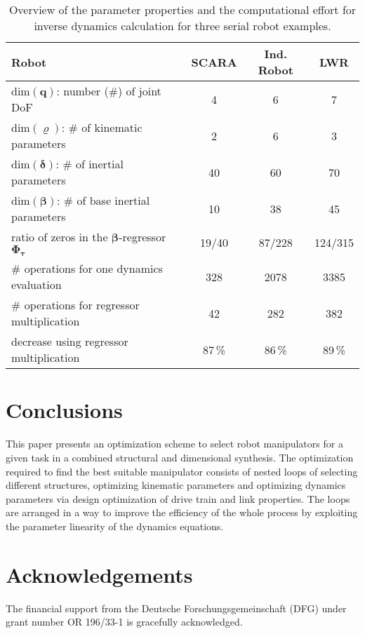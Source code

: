 \documentclass{svproc}
\newcommand{\bm}[1]{\boldsymbol{#1}}
\begin{document}


\begin{table}[tb]
    \caption{Overview of the parameter properties and the computational effort for inverse dynamics calculation for three serial robot examples.}
    \label{tab:computation}
    \centering
    \setlength\tabcolsep{3pt}
    \small
    \begin{tabular}[t]{|l|c|c|c|} 
        \hline
        Robot & SCARA & Ind. Robot & LWR \\
        \hline
        $\mathrm{dim}(\bm{q})$: number (\#) of joint DoF  & 4 & 6 & 7 \\
        $\mathrm{dim}(\bm{\varrho})$: \# of kinematic parameters & 2 & 6 & 3 \\
        $\mathrm{dim}(\bm{\delta})$: \# of inertial parameters & 40 & 60 & 70 \\
        $\mathrm{dim}(\bm{\beta})$: \# of base inertial parameters\footnotemark  & 10 & 38 & 45 \\
        ratio of zeros in the $\bm{\beta}$-regressor $\bm{\Phi}_{\bm{\tau}}$ & 19/40 & 87/228 & 124/315 \\
        \hline
        \# operations for one dynamics evaluation & 328 & 2078 & 3385 \\
        \# operations for regressor multiplication & 42 & 282 & 382 \\
        decrease using regressor multiplication & 87\,\% & 86\,\% & 89\,\% \\
        \hline
    \end{tabular}
    \vspace{-0.5cm}
\end{table}
\section{Conclusions}
\label{sec:Conclusion}


This paper presents an optimization scheme to select robot manipulators for a given task in a combined structural and dimensional synthesis.
The optimization required to find the best suitable manipulator consists of nested loops of selecting different structures, optimizing kinematic parameters and optimizing dynamics parameters via design optimization of drive train and link properties.
The loops are arranged in a way to improve the efficiency of the whole process by exploiting the parameter linearity of the dynamics equations.

\section*{Acknowledgements}

The financial support from the Deutsche Forschungsgemeinschaft (DFG) under grant number OR 196/33-1 is gracefully acknowledged.



\end{document}
